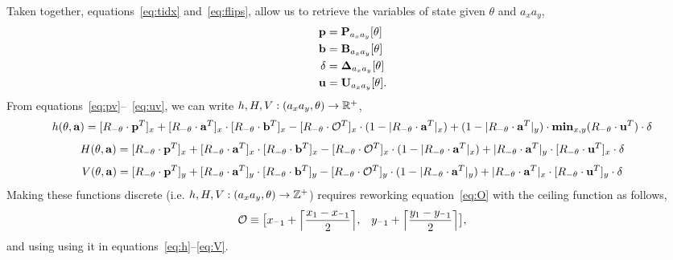 Taken together, equations~\ref{eq:tidx} and~\ref{eq:flips}, allow us to retrieve the variables
 of state given $\theta$ and $a_xa_y$,
\begin{eqnarray}
    \mathbf{p} &= \mathbf{P}_{a_xa_y}[\theta] \label{eq:pv} \\
    \mathbf{b} &= \mathbf{B}_{a_xa_y}[\theta]\\
    \delta &= \mathbf{\Delta}_{a_xa_y}[\theta]\\
    \mathbf{u} &= \mathbf{U}_{a_xa_y}[\theta]. \label{eq:uv}
\end{eqnarray}
From equations~\ref{eq:pv}--~\ref{eq:uv}, we can write $h,H,V: (a_xa_y,\theta) \rightarrow \mathbb{R}^+$,
\begin{equation}
    h(\theta,\av) = [\rnt \cdot \pv^T]_x + [\rnt \cdot \av^T]_x \cdot [\rnt \cdot \bv^T]_x -
    [\rnt \cdot \orig^T]_x \cdot (1 - |\rnt \cdot \av^T|_x) +
    (1 - |\rnt \cdot \av^T|_y) \cdot \mathbf{min}_{x,y}(\rnt \cdot \uv^T ) \cdot \delta
    \label{eq:h}
\end{equation}
\begin{equation}
    H(\theta,\av) = [\rnt \cdot \pv^T]_x + [\rnt \cdot \av^T]_x \cdot [\rnt \cdot \bv^T]_x -
    [\rnt \cdot \orig^T]_x \cdot (1 - |\rnt \cdot \av^T|_x) +
    |\rnt \cdot \av^T|_y \cdot [\rnt \cdot \uv^T ]_x \cdot \delta
    \label{eq:H}
\end{equation}
\begin{equation}
    V(\theta,\av) = [\rnt \cdot \pv^T]_y + [\rnt \cdot \av^T]_y \cdot [\rnt \cdot \bv^T]_y -
    [\rnt \cdot \orig^T]_y \cdot (1 - |\rnt \cdot \av^T|_y) +
    |\rnt \cdot \av^T|_x \cdot [\rnt \cdot \uv^T ]_y \cdot \delta
    \label{eq:V}
\end{equation}
Making these functions discrete (i.e. $h,H,V: (a_xa_y,\theta) \rightarrow \mathbb{Z}^+$)
requires reworking equation~\ref{eq:O} with the ceiling function as follows,
\begin{equation}
    \mathcal{O} \equiv \bigl[x_{^-1} + \ceil[\Big]{\frac{x_1 - x_{^-1}}{2}}, \;\;\;
                             y_{^-1} + \ceil[\Big]{\frac{y_1 - y_{^-1}}{2}} \bigl],
    \label{eq:discreteO}
\end{equation}
and using using it in equations~\eqref{eq:h}--\eqref{eq:V}.

